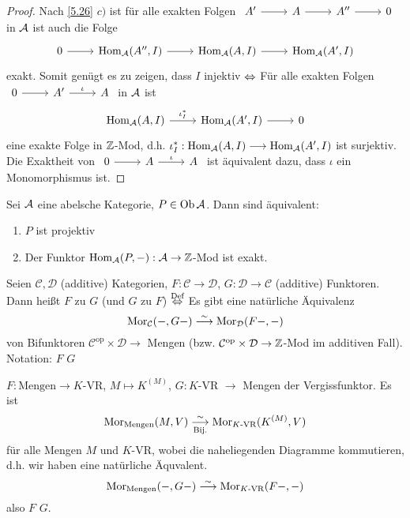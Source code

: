 \begin{proof}
	Nach \ref{5.26} $c)$ ist für alle exakten Folgen $\begin{tikzcd}
	A' \arrow{r} & A \arrow{r} & A'' \arrow{r} & 0
	\end{tikzcd}$ in $\mathcal{A}$ ist auch die Folge
	$$\begin{tikzcd}
	0 \arrow{r}& \Hom_\A(A'', I) \arrow{r} & \Hom_\A(A,I) \arrow{r} & \Hom_\A(A',I)
	\end{tikzcd}$$
	exakt. Somit genügt es zu zeigen, dass $I$ injektiv $\Leftrightarrow$ Für alle exakten Folgen\\ $\begin{tikzcd}
	0 \arrow{r} & A' \arrow{r}{\iota} & A
	\end{tikzcd}$ in $\mathcal{A}$ ist 
	$$\begin{tikzcd}
	\Hom_\A(A,I) \arrow{r}{\iota_I^*} & \Hom_\A(A', I) \arrow{r} & 0
	\end{tikzcd}$$
	eine exakte Folge in $\mathbb{Z}$-Mod, d.h. $\iota_I^*:\operatorname{Hom}_{\mathcal{A}}(A,I) \longrightarrow \operatorname{Hom}_{\mathcal{A}}(A',I)$ ist surjektiv. Die Exaktheit von  $\begin{tikzcd}
	0 \arrow{r} & A \arrow{r}{\iota} & A
	\end{tikzcd}$ ist äquivalent dazu, dass $\iota$ ein Monomorphismus ist.
\end{proof}
\begin{bem}\label{5.30}
	Sei $\mathcal{A}$ eine abelsche Kategorie, $P\in \text{Ob}\,\mathcal{A}$. Dann sind äquivalent:
	\begin{enumerate}[label= \roman*)]
		\item $P$ ist projektiv
		\item Der Funktor $\operatorname{Hom}_{\mathcal{A}}(P,-): \mathcal{A} \to \mathbb{Z}$-Mod ist exakt.
	\end{enumerate}
\end{bem}
\begin{df}\label{5.31}
	Seien $\mathcal{C}, \mathcal{D}$  (additive) Kategorien, $F: \mathcal{C} \to \mathcal{D}$, $G: \mathcal{D} \to \mathcal{C}$ (additive) Funktoren. Dann heißt $F$  zu $G$ (und $G$  zu $F$) $\overset{\text{Def}}{\Leftrightarrow}$ Es gibt eine natürliche Äquivalenz
	$$\text{Mor}_\mathcal{C}(-, G -) \overset{\sim}{\longrightarrow} \text{Mor}_\mathcal{D}( F -, -)$$
	von Bifunktoren $\mathcal{C}^\text{op} \times \mathcal{D} \to$ Mengen (bzw. $\mathcal{C}^\text{op} \times \mathcal{D} \to \mathbb{Z}$-Mod im additiven Fall).\\
	Notation: $F $  $G$
\end{df}
\begin{bsp}
	$F: \text{Mengen} \to K$-VR, $M\mapsto K^{(M)}$, $G: K$-VR $ \to$ Mengen der Vergissfunktor. Es ist $$\text{Mor}_{\text{Mengen}}(M,V) \underset{\text{Bij.}}{\overset{\sim}{\longrightarrow}} \text{Mor}_{K\text{-VR}}(K^{(M)} , V)$$
	für alle Mengen $M$ und $K$-VR, wobei die naheliegenden Diagramme kommutieren, d.h. wir haben eine natürliche Äquvalent.
	$$\text{Mor}_\text{Mengen}(-, G-) \overset{\sim}{\longrightarrow} \text{Mor}_{K\text{-VR}}(F -, -)$$
	also $F$  $G$.
\end{bsp}
